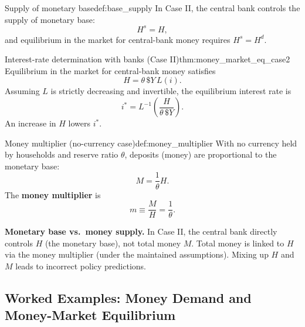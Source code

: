 \begin{definition}{Supply of monetary base}{def:base_supply}
In Case II, the central bank controls the supply of monetary base:
\[
H^s = H,
\]
and equilibrium in the market for central-bank money requires $H^s=H^d$.
\end{definition}

\begin{theorem}{Interest-rate determination with banks (Case II)}{thm:money_market_eq_case2}
Equilibrium in the market for central-bank money satisfies
\[
H = \theta\,\$Y\,L(i).
\]
Assuming $L$ is strictly decreasing and invertible, the equilibrium interest rate is
\[
i^\ast = L^{-1}\!\left(\frac{H}{\theta\,\$Y}\right).
\]
An increase in $H$ lowers $i^\ast$.
\end{theorem}

\begin{definition}{Money multiplier (no-currency case)}{def:money_multiplier}
With no currency held by households and reserve ratio $\theta$, deposits (money) are proportional to the monetary base:
\[
M = \frac{1}{\theta}H.
\]
The \textbf{money multiplier} is
\[
m \equiv \frac{M}{H} = \frac{1}{\theta}.
\]
\end{definition}

\begin{commonmistake}
\textbf{Monetary base vs.\ money supply.}
In Case II, the central bank directly controls $H$ (the monetary base), not total money $M$.
Total money is linked to $H$ via the money multiplier (under the maintained assumptions).
Mixing up $H$ and $M$ leads to incorrect policy predictions.
\end{commonmistake}


\newpage
\subsection{Worked Examples: Money Demand and Money-Market Equilibrium}

